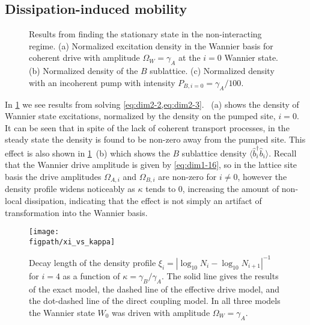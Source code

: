 \subsection{Dissipation-induced mobility}

\begin{figure}[ht!]
\centering
{}%
%
\caption{Results from finding the stationary state in the non-interacting regime. (a) Normalized excitation density in the Wannier basis for coherent drive with amplitude \(\Omega_{W} = \gamma_{A}\) at the \(i=0\) Wannier state. (b) Normalized density of the \(B\) sublattice. (c) Normalized density with an incoherent pump with intensity \(P_{B,i=0} = \gamma_{A}/100\).}
\label{fig:dim2-1}
\end{figure}

In \cref{fig:dim2-1} we see results from solving \cref{eq:dim2-2,eq:dim2-3}. ~(a) shows the density of Wannier state excitations, normalized by the density on the pumped site, \(i=0\). It can be seen that in spite of the lack of coherent transport processes, in the steady state the density is found to be non-zero away from the pumped site. This effect is also shown in \cref{fig:dim2-1}~(b) which shows the \(B\) sublattice density \(\langle \hat{b}_{i}^{\dagger}\hat{b}_{i} \rangle\). Recall that the Wannier drive amplitude is given by \cref{eq:dim1-16}, so in the lattice site basis the drive amplitudes \(\Omega_{A,i}\) and \(\Omega_{B,i}\) are non-zero for \(i \neq 0\), however the density profile widens noticeably as \(\kappa\) tends to \(0\), increasing the amount of non-local dissipation, indicating that the effect is not simply an artifact of transformation into the Wannier basis.

\begin{figure}[ht!]
\centering 
\texttt{[image: \\figpath/xi\_vs\_kappa]}
\caption{\label{fig:dim2-2}Decay length of the density profile \(\xi_{i} = |\log_{10}N_{i} - \log_{10}N_{i+1}|^{-1}\) for \(i=4\) as a function of \(\kappa = \gamma_{B}/\gamma_{A}\). The solid line gives the results of the exact model, the dashed line of the effective drive model, and the dot-dashed line of the direct coupling model. In all three models the Wannier state \(W_{0}\) was driven with amplitude \(\Omega_{W} = \gamma_{A}\).}
\end{figure}

